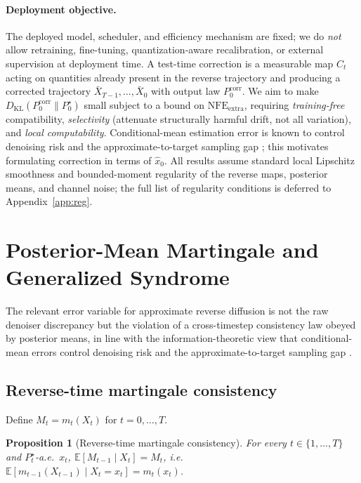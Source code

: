 \documentclass{article}
\theoremstyle{plain}
\newtheorem{proposition}[theorem]{Proposition}
\theoremstyle{definition}
\theoremstyle{remark}
\begin{document}
\paragraph{Deployment objective.}
The deployed model, scheduler, and efficiency mechanism are fixed; we do
\emph{not} allow retraining, fine-tuning, quantization-aware recalibration, or
external supervision at deployment time. A test-time correction is a
measurable map \(C_t\) acting on quantities already present in the reverse
trajectory and producing a corrected trajectory \(\bar X_{T-1},\dots,\bar X_0\)
with output law \(P_0^{\mathrm{corr}}\). We aim to make
\(D_{\mathrm{KL}}(P_0^{\mathrm{corr}} \| P_0^\star)\) small subject to a bound
on \(\mathrm{NFE}_{\mathrm{extra}}\), requiring \emph{training-free}
compatibility, \emph{selectivity} (attenuate structurally harmful drift, not
all variation), and \emph{local computability}. Conditional-mean estimation
error is known to control denoising risk and the approximate-to-target
sampling gap \citep{kong2023itdiffusion,reeves2025itproofs}; this motivates
formulating correction in terms of \(\hat x_0\). All results assume standard
local Lipschitz smoothness and bounded-moment regularity of the reverse
maps, posterior means, and channel noise; the full list of regularity
conditions is deferred to Appendix~\ref{app:reg}.

\section{Posterior-Mean Martingale and Generalized Syndrome}
\label{sec:syndrome}

The relevant error variable for approximate reverse diffusion is not the raw
denoiser discrepancy but the violation of a cross-timestep consistency law
obeyed by posterior means, in line with the information-theoretic view that
conditional-mean errors control denoising risk and the approximate-to-target
sampling gap \citep{guo2005immse,kong2023itdiffusion,reeves2025itproofs}.

\subsection{Reverse-time martingale consistency}

Define \(M_t = m_t(X_t)\) for \(t=0,\dots,T\).

\begin{proposition}[Reverse-time martingale consistency]\label{prop:martingale}
For every \(t\in\{1,\dots,T\}\) and \(P_t^\star\)-a.e.\ \(x_t\),
\(\mathbb{E}[M_{t-1} \mid X_t] = M_t\), i.e.\
\(\mathbb{E}[m_{t-1}(X_{t-1}) \mid X_t = x_t] = m_t(x_t)\).
\end{proposition}
\end{document}
